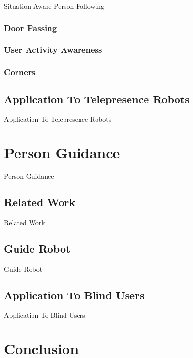 \documentclass[12pt]{gatech-thesis}
\begin{document}
Situation Aware Person Following

\subsection{Door Passing}

\subsection{User Activity Awareness}

\subsection{Corners}


\section{Application To Telepresence Robots}

Application To Telepresence Robots


\chapter{Person Guidance}

Person Guidance

\section{Related Work}

Related Work

\section{Guide Robot}

Guide Robot

\section{Application To Blind Users}

Application To Blind Users


\chapter{Conclusion}
\end{document}
